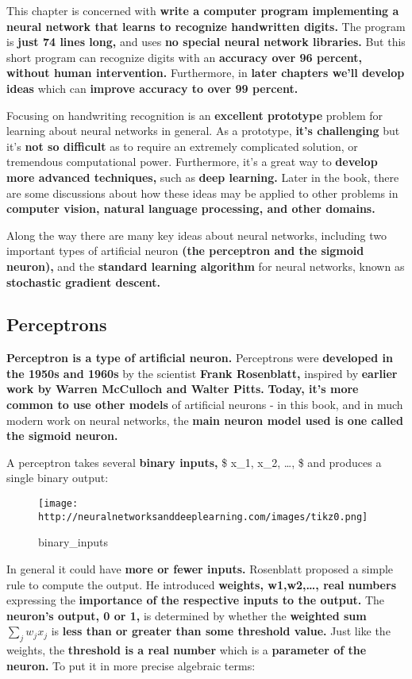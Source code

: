 \documentclass[]{article}
\begin{document}
This chapter is concerned with \textbf{write a computer program
implementing a neural network that learns to recognize handwritten
digits.} The program is \textbf{just 74 lines long,} and uses \textbf{no
special neural network libraries.} But this short program can recognize
digits with an \textbf{accuracy over 96 percent, without human
intervention.} Furthermore, in \textbf{later chapters we'll develop
ideas} which can \textbf{improve accuracy to over 99 percent.}

Focusing on handwriting recognition is an \textbf{excellent prototype}
problem for learning about neural networks in general. As a prototype,
\textbf{it's challenging} but it's \textbf{not so difficult} as to
require an extremely complicated solution, or tremendous computational
power. Furthermore, it's a great way to \textbf{develop more advanced
techniques,} such as \textbf{deep learning.} Later in the book, there
are some discussions about how these ideas may be applied to other
problems in \textbf{computer vision, natural language processing, and
other domains.}

Along the way there are many key ideas about neural networks, including
two important types of artificial neuron \textbf{(the perceptron and the
sigmoid neuron),} and the \textbf{standard learning algorithm} for
neural networks, known as \textbf{stochastic gradient descent.}

\subsection{Perceptrons}\label{perceptrons}

\textbf{Perceptron is a type of artificial neuron.} Perceptrons were
\textbf{developed in the 1950s and 1960s} by the scientist \textbf{Frank
Rosenblatt,} inspired by \textbf{earlier work by Warren McCulloch and
Walter Pitts.} \textbf{Today, it's more common to use other models} of
artificial neurons - in this book, and in much modern work on neural
networks, the \textbf{main neuron model used is one called the sigmoid
neuron.}

A perceptron takes several \textbf{binary inputs,} \$ x\_1, x\_2,
\ldots{}, \$ and produces a single binary output:

\begin{figure}[htbp]
\centering
\texttt{[image: http://neuralnetworksanddeeplearning.com/images/tikz0.png]}
\caption{binary\_inputs}
\end{figure}

In general it could have \textbf{more or fewer inputs.} Rosenblatt
proposed a simple rule to compute the output. He introduced
\textbf{weights, w1,w2,\ldots{}, real numbers} expressing the
\textbf{importance of the respective inputs to the output.} The
\textbf{neuron's output, 0 or 1,} is determined by whether the
\textbf{weighted sum} $\sum_j w_jx_j $ is \textbf{less than or greater
than some threshold value.} Just like the weights, the \textbf{threshold
is a real number} which is a \textbf{parameter of the neuron.} To put it
in more precise algebraic terms:
\end{document}
